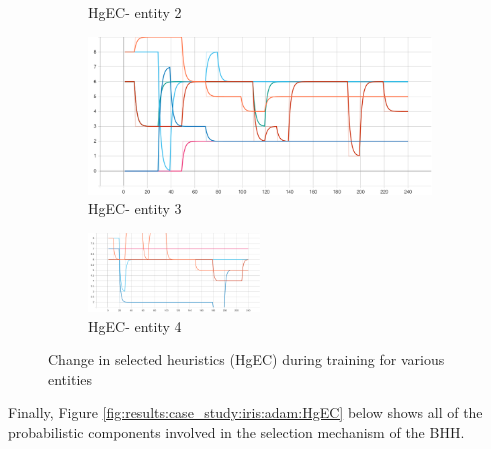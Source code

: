 \begin{figure}[htbp]
\begin{subfigure}{0.5\textwidth}
        \caption{HgEC\rbrack - entity 2}
        \label{fig:results:case_study:iris:HgEC:2}
    \end{subfigure}
    \begin{subfigure}{0.5\textwidth}
        \centering
        \includegraphics[width=\textwidth]{analysis/bhh_case_study/iris/HgEC[3].png}
        \caption{HgEC\rbrack - entity 3}
        \label{fig:results:case_study:iris:HgEC:3}
    \end{subfigure}
    \par\bigskip
    \begin{subfigure}{\textwidth}
        \centering
        \includegraphics[width=0.5\textwidth]{analysis/bhh_case_study/iris/HgEC[4].png}
        \caption{HgEC\rbrack - entity 4}
        \label{fig:results:case_study:iris:HgEC:4}
    \end{subfigure}
    \par\bigskip
    \caption{Change in selected heuristics (HgEC) during training for various entities}
    \label{fig:results:case_study:iris:HgEC}
\end{figure}

Finally, Figure \ref{fig:results:case_study:iris:adam:HgEC} below shows all of the probabilistic components involved in the selection mechanism of the \Ac{BHH}.


